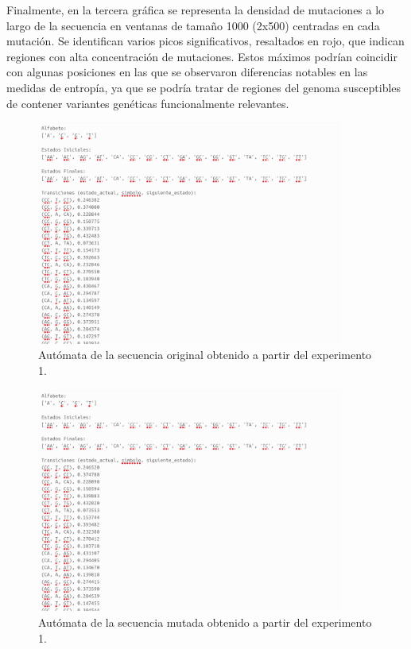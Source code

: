 \documentclass[11pt,spanish,listoffigures,listoftables]{tfgetsinf}
\begin{document}
Finalmente, en la tercera gráfica se representa la densidad de mutaciones a lo largo de la secuencia en ventanas de tamaño 1000 (2x500) centradas en cada mutación. Se identifican varios picos significativos, resaltados en rojo, que indican regiones con alta concentración de mutaciones. Estos máximos podrían coincidir con algunas posiciones en las que se observaron diferencias notables en las medidas de entropía, ya que se podría tratar de regiones del genoma susceptibles de contener variantes genéticas funcionalmente relevantes.  

\begin{figure}[H]
      \centering
      \includegraphics[width=0.9\textwidth]{aut1_exp1.png}
      \caption{Autómata de la secuencia original obtenido a partir del experimento 1.}
      \label{fig:etiqueta_opcional13}
\end{figure}

\begin{figure}[H]
      \centering
      \includegraphics[width=0.9\textwidth]{aut2_exp1.png}
      \caption{Autómata de la secuencia mutada obtenido a partir del experimento 1.}
      \label{fig:etiqueta_opcional14}
\end{figure}
\end{document}
